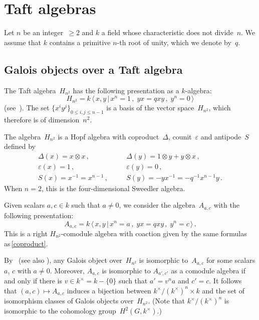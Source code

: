 \documentclass[11pt, a4paper]{amsart}
\theoremstyle{definition}
\numberwithin{equation}{section}
\begin{document}
\section{Taft algebras}\label{sec-Taft}

Let $n$ be an integer~$\geq 2$ and $k$ a field whose characteristic does not divide~$n$.
We assume that $k$ contains a primitive $n$-th root of unity, which we denote by~$q$.

\subsection{Galois objects over a Taft algebra}\label{Taft-def}

The Taft algebra~$H_{n^2}$ has the following presentation as a $k$-algebra:
\[
H_{n^2} = k \, \langle\, x,y \,|\, x^n = 1 \, , \; yx = q xy\, , \;  y^n = 0 \,  \rangle 
\]
(see~\cite{Tf}). The set $\{x^iy^j\}_{0 \leq i,j \leq n-1}$ is a basis of the 
vector space~$H_{n^2}$, which therefore is of dimension~$n^2$. 

The algebra~$H_{n^2}$ is a Hopf algebra with coproduct~$\Delta$, counit~${\varepsilon}$ and antipode~$S$ defined by
\begin{eqnarray}\label{coproduct}
\Delta(x) = x \otimes x\, ,& \quad & \Delta(y) = 1 \otimes y + y \otimes x\, ,\\
{\varepsilon}(x) = 1\, ,& \quad & {\varepsilon}(y) = 0 \, ,\\
S(x) = x^{-1} = x^{n-1} \, ,& \quad & S(y) = - yx^{-1} = - q^{-1} x^{n-1} y \, .
\end{eqnarray}
When $n=2$, this is the four-dimensional Sweedler algebra.

Given scalars $a, c \in k$ such that $a \neq 0$, we consider the algebra~$A_{a,c}$ 
with the following presentation:
\[
A_{a,c} = k \, \langle\, x,y \,|\, x^n = a \, , \; yx = q xy \, , \; y^n = c  \, \rangle \, . 
\]
This is a right $H_{n^2}$-comodule algebra with coaction given by the same formulas as\,\eqref{coproduct}.

By~\cite[Prop.\,2.17 and Prop.\,2.22]{Ma1} (see also \cite{DT2}), any Galois object over~$H_{n^2}$ is isomorphic
to~$A_{a,c}$ for some scalars $a$, $c$ with $a\neq 0$. 
Moreover, $A_{a,c}$ is isomorphic to $A_{a',c'}$ as a comodule algebra
if and only if there is $v\in k^{\times} = k - \{0\}$ such that
$a' = v^n a$ and $c' = c$.
It follows that $(a,c) \mapsto A_{a,c}$ induces a bijection between $k^{\times}/(k^{\times})^n \times k$
and the set of isomorphism classes of Galois objects over~$H_{n^2}$. 
(Note that $k^{\times}/(k^{\times})^n$ is isomorphic to the cohomology group~$H^2(G,k^{\times})$.)
\end{document}
